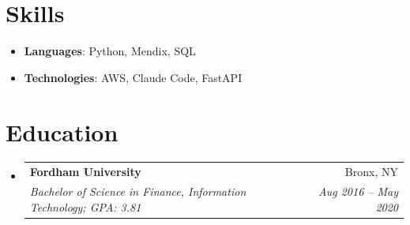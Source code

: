 \documentclass[letterpaper,11pt]{article}
\makeatletter
\newcommand{\resumeSubheading}[4]{
  \vspace{-1pt}\item
    \begin{tabular*}{0.97\textwidth}[t]{l@{\extracolsep{\fill}}r}
      \textbf{#1} & #2 \\
      \textit{\small #3} & \textit{\small #4} \\
    \end{tabular*}\vspace{-5pt}
}
\newcommand{\resumeSubHeadingListStart}{\begin{itemize}[leftmargin=*]}
\newcommand{\resumeSubHeadingListEnd}{\end{itemize}}
\makeatother
\begin{document}
%
\section{Skills}
  \resumeSubHeadingListStart
    \item{\textbf{Languages}{: Python, Mendix, SQL}}
    \item{\textbf{Technologies}{: AWS, Claude Code, FastAPI}}
  \resumeSubHeadingListEnd



\section{Education}
  \resumeSubHeadingListStart
    \resumeSubheading
      {Fordham University}{Bronx, NY }
      {Bachelor of Science in Finance, Information Technology; GPA: 3.81}{Aug 2016 -- May 2020}
  \resumeSubHeadingListEnd
\end{document}
